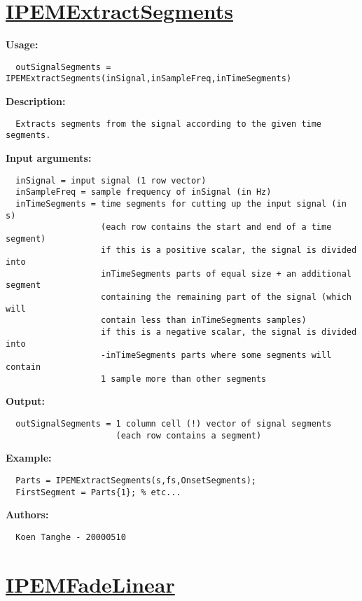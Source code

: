 \newpage
\section*{\hyperlink{Concepts:IPEMExtractSegments}{IPEMExtractSegments}}
\hypertarget{FuncRef:IPEMExtractSegments}{}

\textbf{Usage:}
\begin{verbatim}  outSignalSegments = IPEMExtractSegments(inSignal,inSampleFreq,inTimeSegments)

\end{verbatim}
\textbf{Description:}
\begin{verbatim}  Extracts segments from the signal according to the given time segments.

\end{verbatim}
\textbf{Input arguments:}
\begin{verbatim}  inSignal = input signal (1 row vector)
  inSampleFreq = sample frequency of inSignal (in Hz)
  inTimeSegments = time segments for cutting up the input signal (in s)
                   (each row contains the start and end of a time segment)
                   if this is a positive scalar, the signal is divided into
                   inTimeSegments parts of equal size + an additional segment
                   containing the remaining part of the signal (which will
                   contain less than inTimeSegments samples)
                   if this is a negative scalar, the signal is divided into
                   -inTimeSegments parts where some segments will contain
                   1 sample more than other segments

\end{verbatim}
\textbf{Output:}
\begin{verbatim}  outSignalSegments = 1 column cell (!) vector of signal segments
                      (each row contains a segment)

\end{verbatim}
\textbf{Example:}
\begin{verbatim}  Parts = IPEMExtractSegments(s,fs,OnsetSegments);
  FirstSegment = Parts{1}; % etc...

\end{verbatim}
\textbf{Authors:}
\begin{verbatim}  Koen Tanghe - 20000510
\end{verbatim}


\newpage
\section*{\hyperlink{Concepts:IPEMFadeLinear}{IPEMFadeLinear}}
\hypertarget{FuncRef:IPEMFadeLinear}{}


